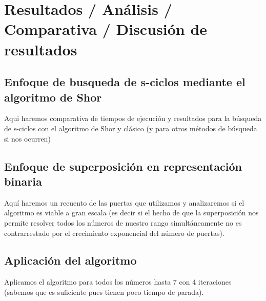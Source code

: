 \chapter{Resultados / Análisis / Comparativa / Discusión de resultados}

\section{Enfoque de busqueda de s-ciclos mediante el algoritmo de Shor}
Aqui haremos comparativa de tiempos de ejecución y resultados para la búsqueda de s-ciclos con el algoritmo de Shor y clásico (y para otros métodos de búsqueda si nos ocurren)


\section{Enfoque de superposición en representación binaria}
Aquí haremos un recuento de las puertas que utilizamos y analizaremos si el algoritmo es viable a gran escala (es decir si el hecho de que la superposición nos permite resolver todos los números de nuestro rango simultáneamente no es contrarrestado por el crecimiento exponencial del número de puertas).


\section{Aplicación del algoritmo}
Aplicamos el algoritmo para todos los números hasta 7 con 4 iteraciones (sabemos que es suficiente pues tienen poco tiempo de parada).

